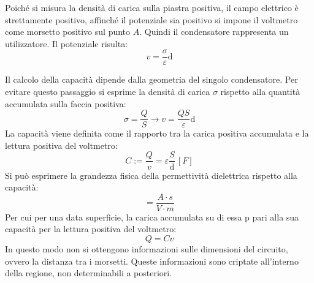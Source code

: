\documentclass{article}
\newcommand{\df}{\mathrm{d}}
\numberwithin{equation}{subsection}
\begin{document}
Poiché si misura la densità di carica sulla piastra positiva, il campo elettrico è strettamente positivo, affinché il potenziale sia positivo si impone il voltmetro come 
morsetto positivo sul punto $A$. Quindi il condensatore rappresenta un utilizzatore. Il potenziale risulta:
\begin{equation*}
    v=\displaystyle\frac{\sigma}{\varepsilon}\df
\end{equation*}

Il calcolo della capacità dipende dalla geometria del singolo condensatore. Per evitare questo passaggio si esprime la densità di carica $\sigma$ rispetto alla quantità 
accumulata sulla faccia positiva:
\begin{equation*}
    \sigma=\displaystyle\frac{Q}{S}\to v=\frac{QS}{\varepsilon}\df
\end{equation*}
La capacità viene definita come il rapporto tra la carica positiva accumulata e la lettura positiva del voltmetro:
\begin{equation}
    C:=\displaystyle\frac{Q}{v}=\varepsilon\frac{S}{\df}\,[F]
\end{equation}
Si può esprimere la grandezza fisica della permettività dielettrica rispetto alla capacità:
\begin{equation*}
    [\varepsilon]=\displaystyle\frac{A\cdot s}{V\cdot m}
\end{equation*} 
Per cui per una data superficie, la carica accumulata su di essa p pari alla sua capacità per la lettura positiva del voltmetro:
\begin{equation*}
    Q=Cv
\end{equation*}
In questo modo non si ottengono informazioni sulle dimensioni del circuito, ovvero la distanza tra i morsetti. Queste informazioni sono criptate all'interno della regione, 
non determinabili a posteriori. 
\end{document}
